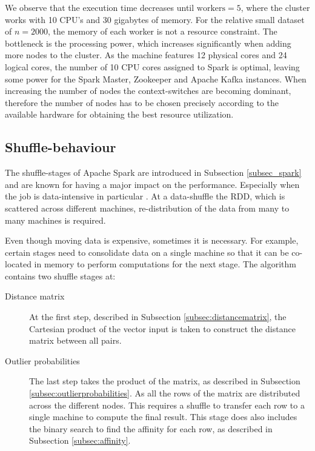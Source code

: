 We observe that the execution time decreases until $\text{workers} = 5$, where the cluster works with 10 CPU's and 30 gigabytes of memory. For the relative small dataset of $n=2000$, the memory of each worker is not a resource constraint. The bottleneck is the processing power, which increases significantly when adding more nodes to the cluster. As the machine features 12 physical cores and 24 logical cores, the number of 10 CPU cores assigned to Spark is optimal, leaving some power for the Spark Master, Zookeeper and Apache Kafka instances. When increasing the number of nodes the context-switches are becoming dominant, therefore the number of nodes has to be chosen precisely according to the available hardware for obtaining the best resource utilization.

\subsection{Shuffle-behaviour \label{subsec:shuffle-behaviour}}

The shuffle-stages of Apache Spark are introduced in Subsection \ref{subsec_spark} and are known for having a major impact on the performance. Especially when the job is data-intensive in particular \cite{Chen:2009:UTI:1592681.1592693}. At a data-shuffle the RDD, which is scattered across different machines, re-distribution of the data from many to many machines is required. 

Even though moving data is expensive, sometimes it is necessary. For example, certain stages need to consolidate data on a single machine so that it can be co-located in memory to perform computations for the next stage. The algorithm contains two shuffle stages at:
\begin{description}
  \item[Distance matrix] At the first step, described in Subsection \ref{subsec:distancematrix}, the Cartesian product of the vector input is taken to construct the distance matrix between all pairs.
  \item[Outlier probabilities] The last step takes the product of the matrix, as described in Subsection \ref{subsec:outlierprobabilities}. As all the rows of the matrix are distributed across the different nodes. This requires a shuffle to transfer each row to a single machine to compute the final result. This stage does also includes the binary search to find the affinity for each row, as described in Subsection \ref{subsec:affinity}.
\end{description}

